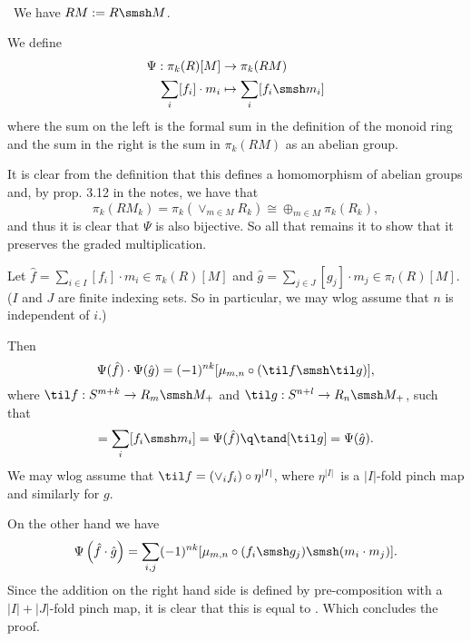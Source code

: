 
\DeclareMathOperator\map{map}
\def\op{\text{op}}



\mmaketitle

\begin{exercise}[1]\ 
\end{exercise}

\begin{exercise}[2]\ 
We have $RM := R \smsh M$.

We define 
\begin{align*}
\Psi : \pi_k(R)[M] &\to \pi_k(RM) \\
\sum_i [f_i] \cdot m_i &\mapsto \sum_i [f_i \smsh m_i]
\end{align*}
where the sum on the left is the formal sum in the definition of the
monoid ring and the sum in the right is the sum in $\pi_k(RM)$ as an abelian
group.

It is clear from the definition that this defines a homomorphism of abelian
groups and, by prop. 3.12 in the notes, we have that 
\[ \pi_k(RM_k) = \pi_k(\vee_{m\in M} R_k) \cong \oplus_{m\in M} \pi_k(R_k), \]
and thus it is clear that $\Psi$ is also bijective. 
So all that remains it to show that it preserves the graded multiplication.

Let $\hat f = \sum_{i\in I} [f_i] \cdot m_i \in \pi_k(R)[M]$ and $\hat g =
\sum_{j\in J} [g_j] \cdot m_j \in \pi_l(R)[M]$. ($I$ and $J$ are finite indexing
sets. So in particular, we may wlog assume that $n$ is independent of $i$.)

Then 
\begin{equation}
\label{eq:5.2.a}
\Psi(\hat f) \cdot \Psi(\hat g) = (-1)^{nk} [\mu_{m,n} \circ (\til f
\smsh \til g)], 
\end{equation}
where $\til f: S^{m+k} \to R_m \smsh M_+$ and $\til g: S^{n+l} \to R_n \smsh
M_+$, such that 
\begin{equation*}
[\til f] = \sum_i [f_i \smsh m_i] = \Psi(\hat f) \q\tand 
[\til g] = \Psi(\hat g).
\end{equation*}
We may wlog assume that $\til f = (\vee_i f_i) \circ \eta^{|I|}$, where $\eta^{|I|}$ is a
$|I|$-fold pinch map and similarly for $g$.

On the other hand we have 
\[ \Psi\left(\hat f \cdot \hat g\right) = \sum_{i,j} (-1)^{nk} [\mu_{m,n} \circ (f_i \smsh
g_j) \smsh (m_i \cdot m_j)]. \] 
Since the addition on the right hand side is defined by pre-composition with a
$|I|+|J|$-fold pinch map, it is clear that this is equal to .
Which concludes the proof.
\end{exercise}

